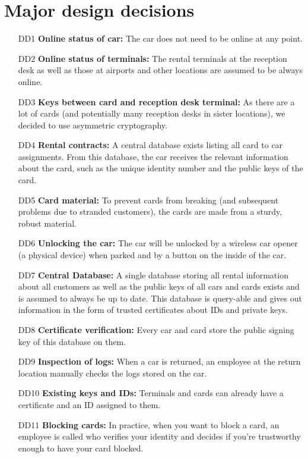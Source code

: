 \documentclass[a4paper]{article}
\begin{document}
\section{Major design decisions}
\begin{enumerate}
    \item[DD1] \textbf{Online status of car:} The car does not need to be online at any point.
    \item[DD2] \textbf{Online status of terminals:} The rental terminals at the reception desk as well as those at airports and other locations are assumed to be always online.
    \item[DD3] \textbf{Keys between card and reception desk terminal:} As there are a lot of cards (and potentially many reception desks in sister locations), we decided to use asymmetric cryptography.
    \item[DD4] \textbf{Rental contracts:} A central database exists listing all card to car assignments. From this database, the car receives the relevant information about the card, such as the unique identity number and the public keys of the card.
    \item[DD5] \textbf{Card material:} To prevent cards from breaking (and subsequent problems due to stranded customers), the cards are made from a sturdy, robust material.
    \item[DD6] \textbf{Unlocking the car:} The car will be unlocked by a wireless car opener (a physical device) when parked and by a button on the inside of the car. 
    \item[DD7] \textbf{Central Database:} A single database storing all rental information about all customers as well as the public keys of all cars and cards exists and is assumed to always be up to date. This database is query-able and gives out information in the form of trusted certificates about IDs and private keys.
    \item[DD8] \textbf{Certificate verification:} Every car and card store the public signing key of this database on them.
    \item[DD9] \textbf{Inspection of logs:} When a car is returned, an employee at the return location manually checks the logs stored on the car.
    \item[DD10] \textbf{Existing keys and IDs:} Terminals and cards can already have a certificate and an ID assigned to them.  %
    \item[DD11] \textbf{Blocking cards:} In practice, when you want to block a card, an employee is called who verifies your identity and decides if you're trustworthy enough to have your card blocked.
    
\end{enumerate}
\end{document}
